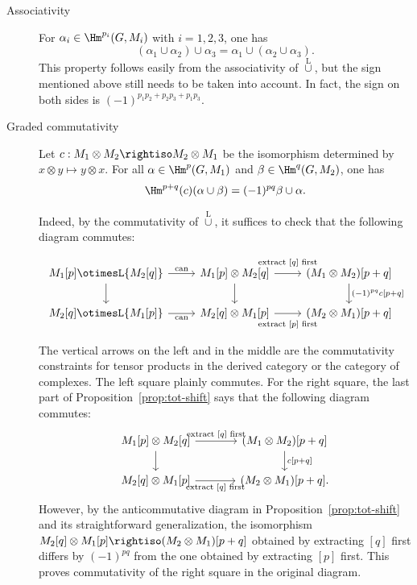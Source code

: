 \begin{description}
	\item[Associativity] For $\alpha_i\in\Hm^{p_i}(G,M_i)$ with
	$i=1,2,3$, one has
	\[ (\alpha_1 \cup \alpha_2) \cup \alpha_3 = \alpha_1 \cup (\alpha_2 \cup \alpha_3). \]
	This property follows easily from the associativity of
	$\overset{\mathrm{L}}{\cup}$, but the sign mentioned above still needs to
	be taken into account. In fact, the sign on both sides is
	$(-1)^{p_1p_2+p_2p_3+p_1p_3}$.

	\item[Graded commutativity] Let
	$c:M_1\otimes M_2\rightiso M_2\otimes M_1$ be the isomorphism determined
	by $x\otimes y\mapsto y\otimes x$. For all
	$\alpha\in\Hm^p(G,M_1)$ and $\beta\in\Hm^q(G,M_2)$, one has
	\[ \Hm^{p+q}(c)(\alpha \cup \beta) = (-1)^{pq} \beta \cup \alpha. \]

	Indeed, by the commutativity of $\overset{\mathrm{L}}{\cup}$, it suffices
	to check that the following diagram commutes:
	\[\begin{tikzcd}
		{M_1[p]} \otimesL {M_2[q]} \arrow[d] \arrow[r, "\text{can}"] & {M_1[p]} \otimes {M_2[q]} \arrow[d] \arrow[r, "\text{extract $[q]$ first}" inner sep=0.6em] & (M_1 \otimes M_2){[p+q]} \arrow[d, "{(-1)^{pq} c[p+q]}"] \\
		{M_2[q]} \otimesL {M_1[p]} \arrow[r, "\text{can}"'] & {M_2[q]} \otimes {M_1[p]} \arrow[r, "\text{extract $[p]$ first}"' inner sep=0.6em] & (M_2 \otimes M_1) {[p+q]}
	\end{tikzcd}\]
	The vertical arrows on the left and in the middle are the commutativity
	constraints for tensor products in the derived category or the category of
	complexes. The left square plainly commutes. For the right square, the last
	part of Proposition~\ref{prop:tot-shift} says that the following diagram
	commutes:
	\[\begin{tikzcd}[column sep=large]
		{M_1[p]} \otimes {M_2[q]} \arrow[d] \arrow[r, "\text{extract $[q]$ first}"] & (M_1 \otimes M_2) {[p+q]} \arrow[d, "{c[p+q]}"] \\
		{M_2[q]} \otimes {M_1[p]} \arrow[r, "\text{extract $[q]$ first}"'] & (M_2 \otimes M_1) {[p+q]}.
	\end{tikzcd}\]
	However, by the anticommutative diagram in
	Proposition~\ref{prop:tot-shift} and its straightforward generalization,
	the isomorphism
	$M_2[q]\otimes M_1[p]\rightiso(M_2\otimes M_1)[p+q]$ obtained by
	extracting $[q]$ first differs by $(-1)^{pq}$ from the one obtained by
	extracting $[p]$ first. This proves commutativity of the right square in
	the original diagram.


\end{description}
